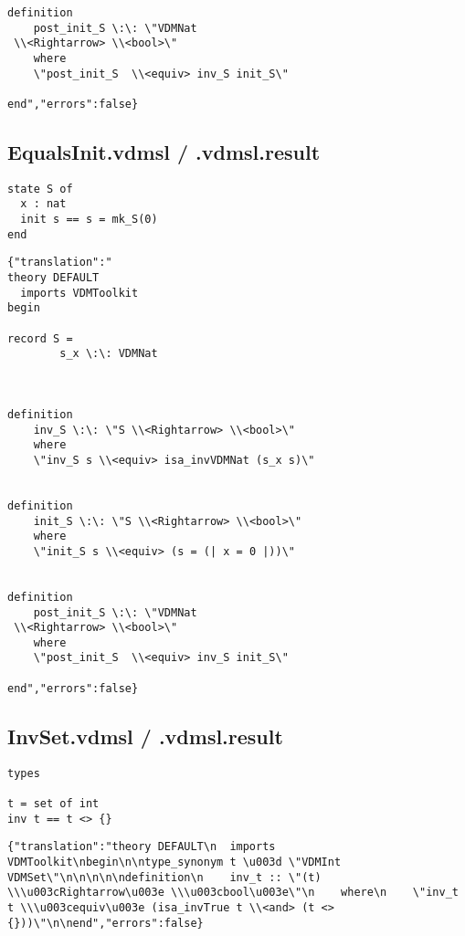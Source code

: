 \begin{appendices}
\begin{lstlisting}
definition
    post_init_S \:\: \"VDMNat
 \\<Rightarrow> \\<bool>\"
    where
    \"post_init_S  \\<equiv> inv_S init_S\"

end","errors":false}
\end{lstlisting}

\subsection{EqualsInit.vdmsl / .vdmsl.result}
\begin{lstlisting}
state S of
  x : nat
  init s == s = mk_S(0)
end
\end{lstlisting}

\begin{lstlisting}
{"translation":"
theory DEFAULT
  imports VDMToolkit
begin

record S =
        s_x \:\: VDMNat

    

definition
    inv_S \:\: \"S \\<Rightarrow> \\<bool>\"
    where
    \"inv_S s \\<equiv> isa_invVDMNat (s_x s)\"


definition
    init_S \:\: \"S \\<Rightarrow> \\<bool>\"
    where
    \"init_S s \\<equiv> (s = (| x = 0 |))\"


definition
    post_init_S \:\: \"VDMNat
 \\<Rightarrow> \\<bool>\"
    where
    \"post_init_S  \\<equiv> inv_S init_S\"

end","errors":false}
\end{lstlisting}

\subsection{InvSet.vdmsl / .vdmsl.result}
\begin{lstlisting}
types

t = set of int
inv t == t <> {}
\end{lstlisting}

\begin{lstlisting}
{"translation":"theory DEFAULT\n  imports VDMToolkit\nbegin\n\ntype_synonym t \u003d \"VDMInt VDMSet\"\n\n\n\n\ndefinition\n    inv_t :: \"(t) \\\u003cRightarrow\u003e \\\u003cbool\u003e\"\n    where\n    \"inv_t t \\\u003cequiv\u003e (isa_invTrue t \\<and> (t <> {}))\"\n\nend","errors":false}
\end{lstlisting}


\end{appendices}
